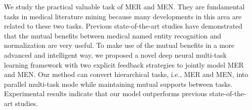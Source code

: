 We study the practical valuable task of MER and MEN.
They are fundamental tasks in medical literature mining because many developments in this area are related to these two tasks. 
Previous state-of-the-art studies have demonstrated that the mutual benefits between medical named entity recognition and normalization are very useful.
To make use of the mutual benefits in a more advanced and intelligent way, we proposed a novel deep neural multi-task learning framework with two explicit feedback strategies to jointly model MER and MEN. Our method can convert hierarchical tasks, i.e., MER and MEN, into parallel multi-task mode while maintaining mutual supports between tasks.
Experimental results indicate that our model outperforms previous state-of-the-art studies.